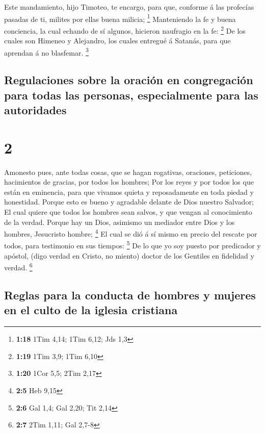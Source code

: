 Este mandamiento, hijo Timoteo, te encargo, para que,
conforme á las profecías pasadas de ti, milites por ellas buena milicia;
\footnote{\textbf{1:18} 1Tim 4,14; 1Tim 6,12; Jds 1,3} 
Manteniendo la fe y buena conciencia, la cual echando de sí algunos,
hicieron naufragio en la fe: \footnote{\textbf{1:19} 1Tim 3,9; 1Tim 6,10}
 De los cuales son Himeneo y Alejandro, los cuales entregué
á Satanás, para que aprendan á no blasfemar. \footnote{\textbf{1:20}
  1Cor 5,5; 2Tim 2,17}

\hypertarget{regulaciones-sobre-la-oraciuxf3n-en-congregaciuxf3n-para-todas-las-personas-especialmente-para-las-autoridades}{%
\subsection{Regulaciones sobre la oración en congregación para todas las
personas, especialmente para las
autoridades}\label{regulaciones-sobre-la-oraciuxf3n-en-congregaciuxf3n-para-todas-las-personas-especialmente-para-las-autoridades}}

\hypertarget{section-1}{%
\section{2}\label{section-1}}

 Amonesto pues, ante todas cosas, que se hagan rogativas,
oraciones, peticiones, hacimientos de gracias, por todos los hombres;
 Por los reyes y por todos los que están en eminencia, para
que vivamos quieta y reposadamente en toda piedad y honestidad.
 Porque esto es bueno y agradable delante de Dios nuestro
Salvador;  El cual quiere que todos los hombres sean salvos,
y que vengan al conocimiento de la verdad.  Porque hay un
Dios, asimismo un mediador entre Dios y los hombres, Jesucristo hombre;
\footnote{\textbf{2:5} Heb 9,15}  El cual se dió á sí mismo
en precio del rescate por todos, para testimonio en sus tiempos:
\footnote{\textbf{2:6} Gal 1,4; Gal 2,20; Tit 2,14}  De lo
que yo soy puesto por predicador y apóstol, (digo verdad en Cristo, no
miento) doctor de los Gentiles en fidelidad y verdad. \footnote{\textbf{2:7}
  2Tim 1,11; Gal 2,7-8}

\hypertarget{reglas-para-la-conducta-de-hombres-y-mujeres-en-el-culto-de-la-iglesia-cristiana}{%
\subsection{Reglas para la conducta de hombres y mujeres en el culto de
la iglesia
cristiana}\label{reglas-para-la-conducta-de-hombres-y-mujeres-en-el-culto-de-la-iglesia-cristiana}}

